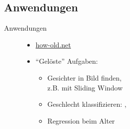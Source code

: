 \subsection{Anwendungen}
\begin{frame}{Anwendungen}
    \begin{figure}[ht]
        \begin{minipage}[b]{0.45\linewidth}
            \begin{itemize}
                \item \href{https://how-old.net}{how-old.net}
                \item \enquote{Gelöste} Aufgaben:
                \begin{itemize}
                    \item Gesichter in Bild finden,\\
                          z.B. mit Sliding Window
                    \item Geschlecht klassifizieren: \male, \female
                    \item Regression beim Alter
                \end{itemize}
            \end{itemize}
            \vspace{2cm}
        \end{minipage}
        \hspace{0.5cm}
        \begin{minipage}[b]{0.45\linewidth}
            \centering
        \end{minipage}
    \end{figure}
\end{frame}

